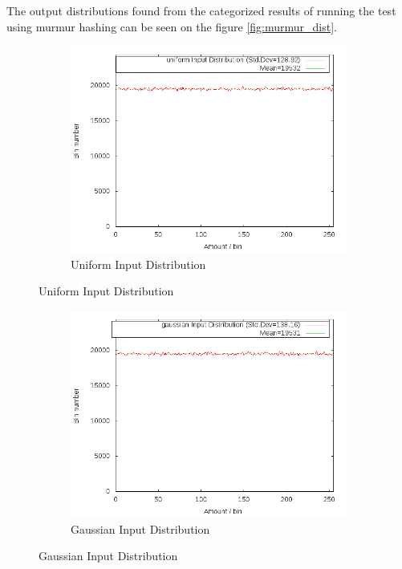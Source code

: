 \documentclass[11pt]{article} %
\begin{document}
The output distributions found from the categorized results of running the test using murmur hashing can be seen on the figure \ref{fig:murmur_dist}. 
\begin{figure}[H]
    \centering
    \begin{subfigure}[b]{0.9\textwidth}
        \includegraphics[width=\textwidth]{Graphs/Dist/Murmur_uniform_dist.png}
        \caption{Uniform Input Distribution}
        \label{fig:murmur_dist_uni}
    \end{subfigure}
\end{figure}
\begin{figure}[H]\ContinuedFloat
    \centering
    \begin{subfigure}[b]{0.9\textwidth}
        \includegraphics[width=\textwidth]{Graphs/Dist/Murmur_gaussian_dist.png}
        \caption{Gaussian Input Distribution}
        \label{fig:murmur_dist_gauss}
    \end{subfigure}
\end{figure}
\end{document}
